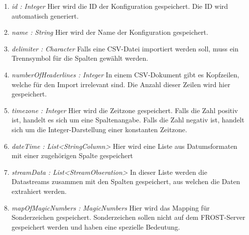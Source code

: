 \begin{enumerate}[-]
	\item \textit{id : Integer} Hier wird die ID der Konfiguration gespeichert. Die ID wird automatisch generiert.
	
	\item \textit{name : String} Hier wird der Name der Konfiguration gespeichert.
	
	\item \textit{delimiter : Character} Falls eine CSV-Datei importiert werden soll, muss ein Trennsymbol für die Spalten gewählt werden.
	
	\item \textit{numberOfHeaderlines : Integer} In einem CSV-Dokument gibt es Kopfzeilen, welche für den Import irrelevant sind. Die Anzahl dieser Zeilen wird hier gespeichert.
	
	\item \textit{timezone : Integer} Hier wird die Zeitzone gespeichert. Falls die Zahl positiv ist, handelt es sich um eine Spaltenangabe. Falls die Zahl negativ ist, handelt sich um die Integer-Darstellung einer konstanten Zeitzone.
	
	\item \textit{dateTime : List<StringColumn>} Hier wird eine Liste aus Datumsformaten mit einer zugehörigen Spalte gespeichert 
	
	\item \textit{streamData : List<StreamObseration>} In dieser Liste werden die Datastreams zusammen mit den Spalten gespeichert, aus welchen die Daten extrahiert werden.
	
	\item \textit{mapOfMagicNumbers : MagicNumbers} Hier wird das Mapping für Sonderzeichen gespeichert. Sonderzeichen sollen nicht auf dem FROST-Server gespeichert werden und haben eine spezielle Bedeutung.
\end{enumerate}

